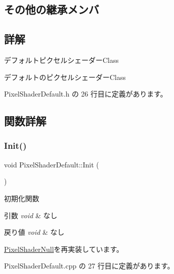 \subsection*{その他の継承メンバ}


\subsection{詳解}
デフォルトピクセルシェーダー\+Class 

デフォルトのピクセルシェーダー\+Class 

 Pixel\+Shader\+Default.\+h の 26 行目に定義があります。



\subsection{関数詳解}
\mbox{\label{class_pixel_shader_default_a74187e4e936d79947753bf4028a411bf}} 
\subsubsection{\texorpdfstring{Init()}{Init()}}
{\footnotesize\ttfamily void Pixel\+Shader\+Default\+::\+Init (\begin{DoxyParamCaption}{ }\end{DoxyParamCaption})\hspace{0.3cm}{\ttfamily [virtual]}}



初期化関数 


\begin{DoxyParams}{引数}
{\em void} & なし \\
\hline
\end{DoxyParams}

\begin{DoxyRetVals}{戻り値}
{\em void} & なし \\
\hline
\end{DoxyRetVals}


\mbox{\hyperlink{class_pixel_shader_null_a5318be2bf26892c385d863e3e8409571}{Pixel\+Shader\+Null}}を再実装しています。



 Pixel\+Shader\+Default.\+cpp の 27 行目に定義があります。

\mbox{\label{class_pixel_shader_default_a18985aa792820858e214f141643119c4}} 
